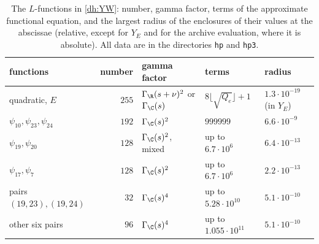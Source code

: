 \begin{table}[htbp]
\centering\small
\caption{The $L$-functions in \eqref{dh:YW}: number, gamma factor, terms of
the approximate functional equation, and the largest radius of the
enclosures of their values at the abscissae (relative, except for $Y_E$ and
for the archive evaluation, where it is absolute). All data are in the
directories \texttt{hp} and \texttt{hp3}.}
\label{lv:results}
\begin{tabular}{lrlll}
\toprule
functions & number & gamma factor & terms & radius\\
\midrule
quadratic, $E$ & $255$ & $\Gamma_\R(s+\nu)^2$ or $\Gamma_\C(s)$ & $8\lfloor\sqrt{Q_e}\rfloor+1$ & $1.3\cdot10^{-19}$ (in $Y_E$)\\
$\psi_{10},\psi_{23},\psi_{24}$ & $192$ & $\Gamma_\C(s)^2$ & $999999$ & $6.6\cdot10^{-9}$\\
$\psi_{19},\psi_{20}$ & $128$ & $\Gamma_\C(s)^2$, mixed & up to $6.7\cdot10^6$ & $6.4\cdot10^{-13}$\\
$\psi_{17},\psi_7$ & $128$ & $\Gamma_\C(s)^2$ & up to $6.7\cdot10^6$ & $2.2\cdot10^{-13}$\\
pairs $(19,23),(19,24)$ & $32$ & $\Gamma_\C(s)^4$ & up to $5.28\cdot10^{10}$ & $5.1\cdot10^{-10}$\\
other six pairs & $96$ & $\Gamma_\C(s)^4$ & up to $1.055\cdot10^{11}$ & $5.1\cdot10^{-10}$\\
\bottomrule
\end{tabular}
\end{table}
